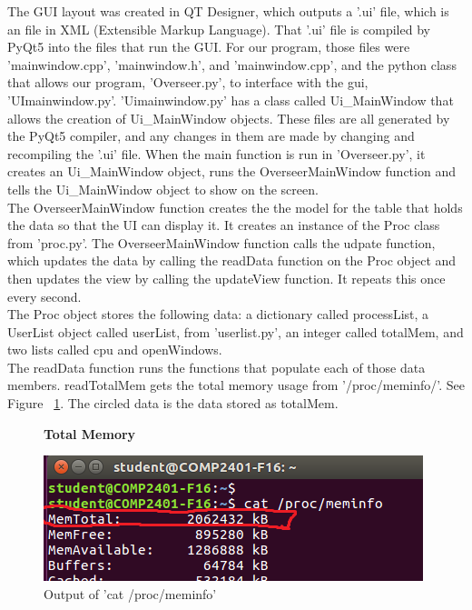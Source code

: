 \documentclass[12pt]{article}
\begin{document}
The GUI layout was created in QT Designer, which outputs a '.ui' file, which is an file in XML (Extensible Markup Language).
That '.ui' file is compiled by PyQt5 into the files that run the GUI.
For our program, those files were 'mainwindow.cpp', 'mainwindow.h', and 'mainwindow.cpp', and the python class that allows our program, 'Overseer.py', to interface with the gui, 'UImainwindow.py'.
'Uimainwindow.py' has a class called Ui\_MainWindow that allows the creation of Ui\_MainWindow objects.
These files are all generated by the PyQt5 compiler, and any changes in them are made by changing and recompiling the '.ui' file.
When the main function is run in 'Overseer.py', it creates an Ui\_MainWindow object, runs the OverseerMainWindow function and tells the Ui\_MainWindow object to show on the screen.\\
The OverseerMainWindow function creates the the model for the table that holds the data so that the UI can display it.
It creates an instance of the Proc class from 'proc.py'.
The OverseerMainWindow function calls the udpate function, which updates the data by calling the readData function on the Proc object and then updates the view by calling the updateView function.
It repeats this once every second.\\
The Proc object stores the following data: a dictionary called processList, a UserList object called userList, from 'userlist.py', an integer called totalMem, and two lists called cpu and openWindows.\\
The readData function runs the functions that populate each of those data members.
readTotalMem gets the total memory usage from '/proc/meminfo/'.
See Figure ~\ref{figTotalMem}.
The circled data is the data stored as totalMem.
\begin{figure}[h]
	\centering
	\textbf{Total Memory}\par\medskip
	\includegraphics{totalMem}
	\caption{Output of 'cat /proc/meminfo'}
	\label{figTotalMem}
\end{figure}
\end{document}
